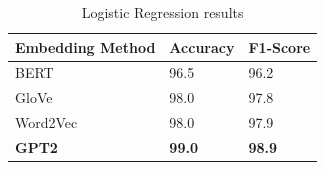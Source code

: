 \begin{table}[hbt!]
\begin{threeparttable}
\caption{Logistic Regression results}
\label{lr_results}
\begin{tabular}{lll}
\toprule
\headrow Embedding Method & Accuracy & F1-Score\\
\midrule
 BERT     &       96.5 &       96.2 \\
 GloVe    &       98.0 &       97.8 \\
 Word2Vec &       98.0 &       97.9 \\
 \textbf{GPT2}     &       \textbf{99.0} &       \textbf{98.9} \\
\bottomrule
\end{tabular}
\end{threeparttable}
\end{table}